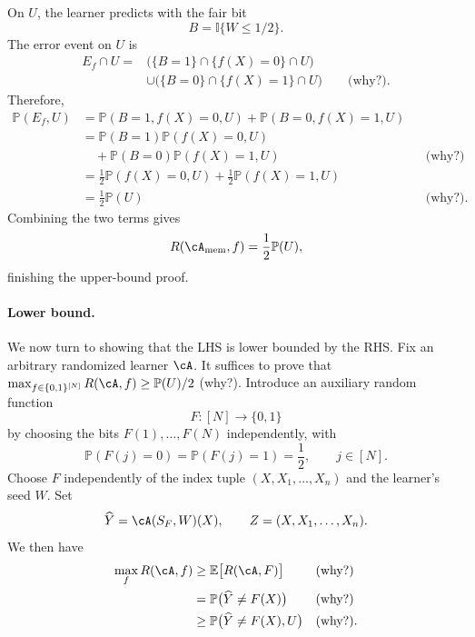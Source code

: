 \documentclass[11pt,twoside]{article}
\newcommand{\I}{\mathbb I}
\renewcommand{\P}{\mathbb P}
\newcommand{\cAmem}{\cA_{\mathrm{mem}}}
\theoremstyle{definition}
\theoremstyle{remark}
\begin{document}
On $U$, the learner predicts with the fair bit
\[
B=\I\{W\le 1/2\}.
\]
The error event on $U$ is
\begin{align*}
E_f\cap U
={}&\bigl(\{B=1\}\cap\{f(X)=0\}\cap U\bigr)\\
&\cup
\bigl(\{B=0\}\cap\{f(X)=1\}\cap U\bigr)
\qquad\text{(why?).}
\end{align*}
Therefore,
\begin{align*}
\P(E_f,U)
&=\P(B=1,f(X)=0,U)+\P(B=0,f(X)=1,U)\\
&=\P(B=1)\P(f(X)=0,U)\\
&\quad+\P(B=0)\P(f(X)=1,U)
&&\text{(why?)}\\
&=\frac12\P(f(X)=0,U)+\frac12\P(f(X)=1,U)\\
&=\frac12\P(U)
&&\text{(why?).}
\end{align*}
Combining the two terms gives
\[
R(\cAmem,f)=\frac12\P(U),
\]
finishing the upper-bound proof.

\paragraph{Lower bound.}
We now turn to showing that the LHS is lower bounded by the RHS. Fix an
arbitrary randomized learner $\cA$.
It suffices to prove that
$\max_{f\in\{0,1\}^{[N]}}R(\cA,f)\ge \P(U)/2$ (why?).
Introduce an auxiliary random function
\[
F:[N]\longrightarrow\{0,1\}
\]
by choosing the bits $F(1),\ldots,F(N)$ independently, with
\[
\P(F(j)=0)=\P(F(j)=1)=\frac12,
\qquad j\in[N].
\]
Choose $F$ independently of the index tuple $(X,X_1,\ldots,X_n)$ and the
learner's seed $W$. Set
\[
\widehat Y=\cA(S_F,W)(X),
\qquad
Z=(X,X_1,\ldots,X_n).
\]
We then have
\begin{align*}
\max_f R(\cA,f)
&\ge \mathbb E\bigl[R(\cA,F)\bigr]
&&\text{(why?)}\\
&=\P\bigl(\widehat Y\ne F(X)\bigr)
&&\text{(why?)}\\
&\ge \P\bigl(\widehat Y\ne F(X),U\bigr)
&&\text{(why?).}
\end{align*}
\end{document}
